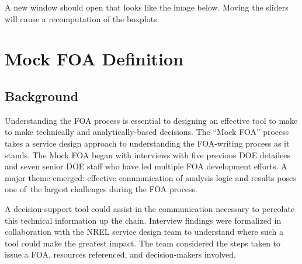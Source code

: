 \documentclass[letterpaper,10pt,english]{sphinxmanual}
\begin{document}
\begin{sphinxVerbatim}[commandchars=\\\{\}]
  
\end{sphinxVerbatim}

A new window should open that looks like the image below. Moving the
sliders will cause a recomputation of the boxplots.

\begin{sphinxVerbatim}[commandchars=\\\{\}]
\end{sphinxVerbatim}

\noindent{}


\chapter{Mock FOA Definition}
\label{\detokenize{mock-foa:mock-foa-definition}}\label{\detokenize{mock-foa::doc}}

\section{Background}
\label{\detokenize{mock-foa:background}}
Understanding the FOA process is essential to designing an effective
tool to make to make technically and analytically-based decisions. The
“Mock FOA” process takes a service design approach to understanding the
FOA-writing process as it stands. The Mock FOA began with interviews
with five previous DOE detailees and seven senior DOE staff who have led
multiple FOA development efforts. A major theme emerged: effective
communication of analysis logic and results poses one of the largest
challenges during the FOA process.

A decision-support tool could assist in the communication necessary to
percolate this technical information up the chain. Interview findings
were formalized in collaboration with the NREL service design team to
understand where such a tool could make the greatest impact. The team
considered the steps taken to issue a FOA, resources referenced, and
decision-makers involved.
\end{document}
